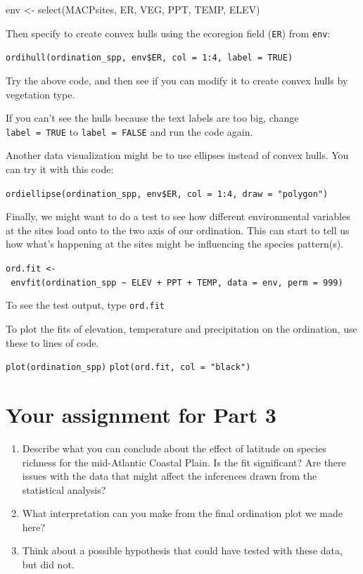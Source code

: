 \documentclass[
]{book}
\newenvironment{Shaded}{\begin{snugshade}}{\end{snugshade}}
\newcommand{\FunctionTok}[1]{\textcolor[rgb]{0.00,0.00,0.00}{#1}}
\newcommand{\NormalTok}[1]{#1}
\newcommand{\OtherTok}[1]{\textcolor[rgb]{0.56,0.35,0.01}{#1}}
\begin{document}
\begin{Shaded}
\begin{Highlighting}[]
\NormalTok{env }\OtherTok{\textless{}{-}} \FunctionTok{select}\NormalTok{(MACPsites, ER, VEG, PPT, TEMP, ELEV)}
\end{Highlighting}
\end{Shaded}

Then specify to create convex hulls using the ecoregion field (\texttt{ER}) from \texttt{env}:

\texttt{ordihull(ordination\_spp,\ env\$ER,\ col\ =\ 1:4,\ label\ =\ TRUE)}

Try the above code, and then see if you can modify it to create convex hulls by vegetation type.

If you can't see the hulls because the text labels are too big, change \texttt{label\ =\ TRUE} to \texttt{label\ =\ FALSE} and run the code again.

Another data visualization might be to use ellipses instead of convex hulls. You can try it with this code:

\texttt{ordiellipse(ordination\_spp,\ env\$ER,\ col\ =\ 1:4,\ draw\ =\ "polygon")}

Finally, we might want to do a test to see how different environmental variables at the sites load onto to the two axis of our ordination. This can start to tell us how what's happening at the sites might be influencing the species pattern(s).

\texttt{ord.fit\ \textless{}-\ envfit(ordination\_spp\ \textasciitilde{}\ ELEV\ +\ PPT\ +\ TEMP,\ data\ =\ env,\ perm\ =\ 999)}

To see the test output, type \texttt{ord.fit}

To plot the fits of elevation, temperature and precipitation on the ordination, use these to lines of code.

\texttt{plot(ordination\_spp)}
\texttt{plot(ord.fit,\ col\ =\ "black")}

\hypertarget{your-assignment-for-part-3}{%
\chapter{Your assignment for Part 3}\label{your-assignment-for-part-3}}

\begin{enumerate}
\def\labelenumi{\arabic{enumi}.}
\item
  Describe what you can conclude about the effect of latitude on species richness for the mid-Atlantic Coastal Plain. Is the fit significant? Are there issues with the data that might affect the inferences drawn from the statistical analysis?
\item
  What interpretation can you make from the final ordination plot we made here?
\item
  Think about a possible hypothesis that \citet{McMullin2019} could have tested with these data, but did not.
\end{enumerate}
\end{document}
